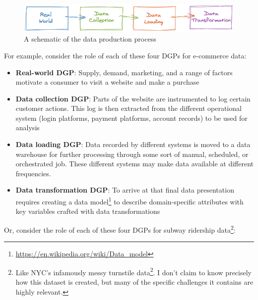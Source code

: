 \documentclass[
]{krantz}
\providecommand{\tightlist}{%
  \setlength{\itemsep}{0pt}\setlength{\parskip}{0pt}}
\renewcommand{\href}[2]{#2\footnote{\url{#1}}}
\begin{document}
\begin{figure}

{\centering \includegraphics[width=0.9\linewidth]{figures/data-dall/dgp} 

}

\caption{A schematic of the data production process}\label{fig:unnamed-chunk-3}
\end{figure}

For example, consider the role of each of these four DGPs for e-commerce data:

\begin{itemize}
\tightlist
\item
  \textbf{Real-world DGP}: Supply, demand, marketing, and a range of factors motivate a consumer to visit a website and make a purchase
\item
  \textbf{Data collection DGP}: Parts of the website are instrumented to log certain customer actions. This log is then extracted from the different operational system (login platforms, payment platforms, account records) to be used for analysis
\item
  \textbf{Data loading DGP}: Data recorded by different systems is moved to a data warehouse for further processing through some sort of manual, scheduled, or orchestrated job. These different systems may make data available at different frequencies.
\item
  \textbf{Data transformation DGP}: To arrive at that final data presentation requires creating a \href{https://en.wikipedia.org/wiki/Data_model}{data model} to describe domain-specific attributes with key variables crafted with data transformations
\end{itemize}

Or, consider the role of each of these four DGPs for subway ridership data\footnote{Like NYC's infamously messy \href{http://web.mta.info/developers/turnstile.html}{turnstile data}. I don't claim to know precisely how this dataset is created, but many of the specific challenges it contains are highly relevant.}:
\end{document}
